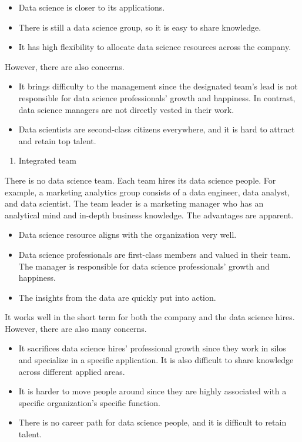 \documentclass[
  12pt,
]{krantz}
\providecommand{\tightlist}{%
  \setlength{\itemsep}{0pt}\setlength{\parskip}{0pt}}
\begin{document}
\begin{itemize}
\tightlist
\item
  Data science is closer to its applications.
\item
  There is still a data science group, so it is easy to share knowledge.
\item
  It has high flexibility to allocate data science resources across the company.
\end{itemize}

However, there are also concerns.

\begin{itemize}
\tightlist
\item
  It brings difficulty to the management since the designated team's lead is not responsible for data science professionals' growth and happiness. In contrast, data science managers are not directly vested in their work.
\item
  Data scientists are second-class citizens everywhere, and it is hard to attract and retain top talent.
\end{itemize}

\begin{enumerate}
\def\labelenumi{(\arabic{enumi})}
\setcounter{enumi}{2}
\tightlist
\item
  Integrated team
\end{enumerate}

There is no data science team. Each team hires its data science people. For example, a marketing analytics group consists of a data engineer, data analyst, and data scientist. The team leader is a marketing manager who has an analytical mind and in-depth business knowledge. The advantages are apparent.

\begin{itemize}
\tightlist
\item
  Data science resource aligns with the organization very well.
\item
  Data science professionals are first-class members and valued in their team. The manager is responsible for data science professionals' growth and happiness.
\item
  The insights from the data are quickly put into action.
\end{itemize}

It works well in the short term for both the company and the data science hires. However, there are also many concerns.

\begin{itemize}
\tightlist
\item
  It sacrifices data science hires' professional growth since they work in silos and specialize in a specific application. It is also difficult to share knowledge across different applied areas.
\item
  It is harder to move people around since they are highly associated with a specific organization's specific function.
\item
  There is no career path for data science people, and it is difficult to retain talent.
\end{itemize}
\end{document}

